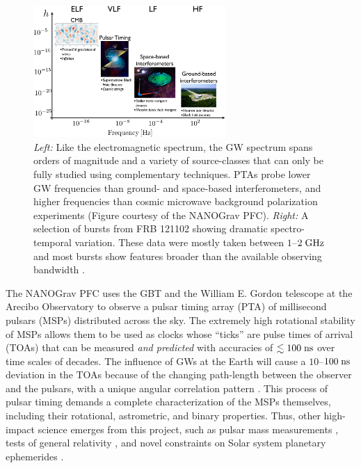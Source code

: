 \documentclass[10pt]{myNSF}
\begin{document}
\begin{figure}
  \centering
  \includegraphics[width=0.65\textwidth]{gw_spectrum.png}
  \caption{\emph{Left:} Like the electromagnetic spectrum, the GW
    spectrum spans orders of magnitude and a variety of source-classes
    that can only be fully studied using complementary techniques.
    PTAs probe lower GW frequencies than ground- and space-based
    interferometers, and higher frequencies than cosmic microwave
    background polarization experiments (Figure courtesy of the
    NANOGrav PFC). \emph{Right:} A selection of bursts from FRB 121102
    showing dramatic spectro-temporal variation.  These data were
    mostly taken between $1$--$2\; \textrm{GHz}$ and most bursts show features
    broader than the available observing
    bandwidth \cite{ssh+16}. \label{fig:gw_spectrum}}
\end{figure}

The NANOGrav PFC uses the GBT and the William E. Gordon telescope at
the Arecibo Observatory to observe a pulsar timing array (PTA) of
millisecond pulsars (MSPs) distributed across the sky.  The extremely
high rotational stability of MSPs allows them to be used as clocks
whose ``ticks'' are pulse times of arrival (TOAs) that can be measured
\emph{and predicted} with accuracies of $\lesssim 100\; \textrm{ns}$ over time
scales of decades.  The influence of GWs at the Earth will cause a
$10$--$100\; \textrm{ns}$ deviation in the TOAs because of the changing
path-length between the observer and the pulsars, with a unique
angular correlation pattern \cite{hd83}.  This process of pulsar
timing demands a complete characterization of the MSPs themselves,
including their rotational, astrometric, and binary properties.  Thus,
other high-impact science emerges from this project, such as pulsar
mass measurements \citep{epe+16}, tests of general relativity
\citep{zsd+15}, and novel constraints on Solar system planetary
ephemerides \citep{abb+18}.
\end{document}
